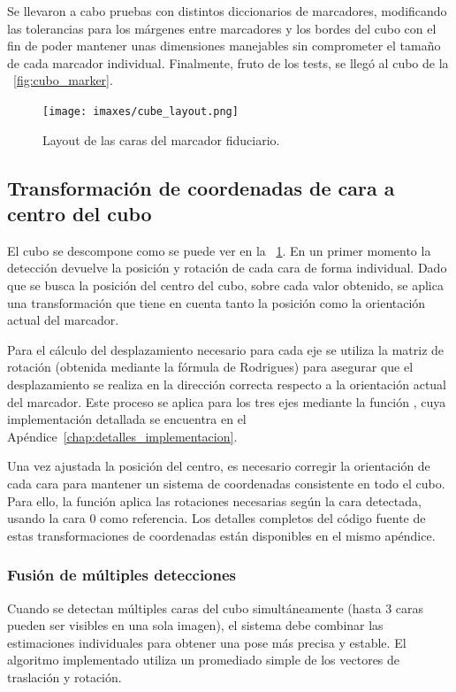 Se llevaron a cabo pruebas con distintos diccionarios de marcadores, modificando las tolerancias para los márgenes entre marcadores y los bordes del cubo con el fin de poder mantener unas dimensiones manejables sin comprometer el tamaño de cada marcador individual.
Finalmente, fruto de los tests, se llegó al cubo de la \figurename~\ref{fig:cubo_marker}.

\begin{figure}
	\centering
	\texttt{[image: imaxes/cube\_layout.png]}
	\caption{Layout de las caras del marcador fiduciario.}
	\label{fig:cube_layout}
\end{figure}

\subsection{Transformación de coordenadas de cara a centro del cubo}

El cubo se descompone como se puede ver en la \figurename~\ref{fig:cube_layout}. En un primer momento la detección devuelve la posición y rotación de cada cara de forma individual. Dado que se busca la posición del centro del cubo, sobre cada valor obtenido, se aplica una transformación que tiene en cuenta tanto la posición como la orientación actual del marcador.

Para el cálculo del desplazamiento necesario para cada eje se utiliza la matriz de rotación (obtenida mediante la fórmula de Rodrigues) para asegurar que el desplazamiento se realiza en la dirección correcta respecto a la orientación actual del marcador. Este proceso se aplica para los tres ejes mediante la función , cuya implementación detallada se encuentra en el Apéndice~\ref{chap:detalles_implementacion}.

Una vez ajustada la posición del centro, es necesario corregir la orientación de cada cara para mantener un sistema de coordenadas consistente en todo el cubo. Para ello, la función  aplica las rotaciones necesarias según la cara detectada, usando la cara 0 como referencia. Los detalles completos del código fuente de estas transformaciones de coordenadas están disponibles en el mismo apéndice.

\subsubsection{Fusión de múltiples detecciones}
Cuando se detectan múltiples caras del cubo simultáneamente (hasta 3 caras pueden ser visibles en una sola imagen), el sistema debe combinar las estimaciones individuales para obtener una pose más precisa y estable. El algoritmo implementado utiliza un promediado simple de los vectores de traslación y rotación.


